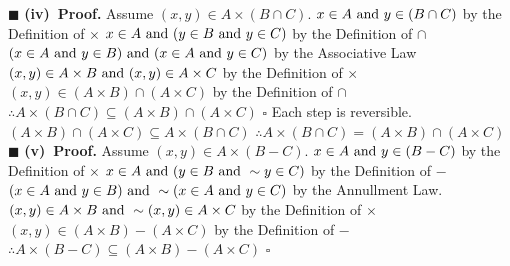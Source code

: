 \documentclass[12pt]{article}
\begin{document}
	\newline \(\blacksquare\)
	\newline
	\newline
	\textbf{(iv)\ Proof.}
	\newline
	Assume \((x,y) \in A \times (B \cap C)\). \newline
	\(x \in A \textup{ and } y \in (B \cap C)\) by the Definition of \(\times\)
	\newline
	\(x \in A \textup{ and } (y \in B \textup{ and } y \in C)\) by the Definition of \(\cap\)
	\newline
	\((x \in A \textup{ and } y \in B) \textup{ and } (x \in A \textup{ and } y \in C)\) by the Associative Law
	\newline
	\((x,y) \in A \times B \textup{ and } (x,y) \in A \times C\) by the Definition of \(\times\)
	\newline
	\((x,y) \in (A \times B) \cap (A \times C)\) by the Definition of \(\cap\)
	\newline
	\(\therefore A \times (B \cap C) \subseteq (A \times B) \cap (A \times C)\)
	\newline \(\square\) \newline
	Each step is reversible.
	\newline
	\((A \times B) \cap (A \times C) \subseteq A \times (B \cap C)\)
	\newline
	\(\therefore A \times (B \cap C) = (A \times B) \cap (A \times C)\)
	\newline \(\blacksquare\) \newline \newline
	\textbf{(v)\ Proof.}
	Assume \((x,y) \in A \times (B - C)\).
	\newline
	\(x \in A \textup{ and } y \in (B - C)\) by the Definition of \(\times\)
	\newline
	\(x \in A \textup{ and } (y \in B \textup{ and } \sim y \in C)\) by the Definition of \(-\)
	\newline
	\((x \in A \textup{ and } y \in B) \textup{ and } \sim(x \in A \textup{ and } y \in C)\) by the Annullment Law.
	\newline
	\((x,y) \in A \times B \textup{ and } \sim (x,y) \in A \times C\) by the Definition of \(\times\)
	\newline
	\((x,y) \in (A \times B) - (A \times C)\) by the Definition of \(-\)
	\newline
	\(\therefore A \times (B - C) \subseteq (A \times B) - (A \times C) \)
	\newline \(\square\) \newline
\end{document}

